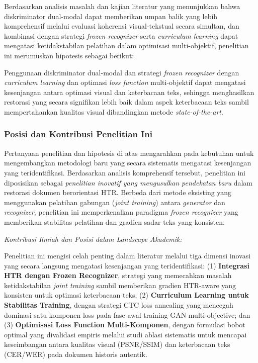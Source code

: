 \documentclass[12pt,a4paper]{article}
\begin{document}
Berdasarkan analisis masalah dan kajian literatur yang menunjukkan bahwa diskriminator dual-modal dapat memberikan umpan balik yang lebih komprehensif melalui evaluasi koherensi visual-tekstual secara simultan, dan kombinasi dengan strategi \textit{frozen recognizer} serta \textit{curriculum learning} dapat mengatasi ketidakstabilan pelatihan dalam optimisasi multi-objektif, penelitian ini merumuskan hipotesis sebagai berikut:

\vspace{0.5em}
Penggunaan diskriminator dual-modal dan strategi \textit{frozen recognizer} dengan \textit{curriculum learning} dan optimasi \textit{loss function} multi-objektif dapat mengatasi kesenjangan antara optimasi visual dan keterbacaan teks, sehingga menghasilkan restorasi yang secara signifikan lebih baik dalam aspek keterbacaan teks sambil mempertahankan kualitas visual dibandingkan metode \textit{state-of-the-art}.

\subsubsection{Posisi dan Kontribusi Penelitian Ini}
\label{subsubsec:research-positioning}

\vspace{1.5ex}

Pertanyaan penelitian dan hipotesis di atas mengarahkan pada kebutuhan untuk mengembangkan metodologi baru yang secara sistematis mengatasi kesenjangan yang teridentifikasi. Berdasarkan analisis komprehensif tersebut, penelitian ini diposisikan sebagai \textit{penelitian inovatif yang mengusulkan pendekatan baru} dalam restorasi dokumen berorientasi HTR. Berbeda dari metode eksisting yang menggunakan pelatihan gabungan (\textit{joint training}) antara \textit{generator} dan \textit{recognizer}, penelitian ini memperkenalkan paradigma \textit{frozen recognizer} yang memberikan stabilitas pelatihan dan gradien sadar-teks yang konsisten.

\vspace{0.5ex}
\textit{Kontribusi Ilmiah dan Posisi dalam Landscape Akademik:}

\vspace{0.3em}
Penelitian ini mengisi celah penting dalam literatur melalui tiga dimensi inovasi yang secara langsung mengatasi kesenjangan yang teridentifikasi: (1) \textbf{Integrasi HTR dengan Frozen Recognizer}, strategi yang memecahkan masalah ketidakstabilan \textit{joint training} sambil memberikan gradien HTR-aware yang konsisten untuk optimasi keterbacaan teks; (2) \textbf{Curriculum Learning untuk Stabilitas Training}, dengan strategi CTC loss annealing yang mencegah dominasi satu komponen loss pada fase awal training GAN multi-objective; dan (3) \textbf{Optimisasi Loss Function Multi-Komponen}, dengan formulasi bobot optimal yang divalidasi empiris melalui studi ablasi sistematis untuk mencapai keseimbangan antara kualitas visual (PSNR/SSIM) dan keterbacaan teks (CER/WER) pada dokumen historis autentik.
\end{document}
